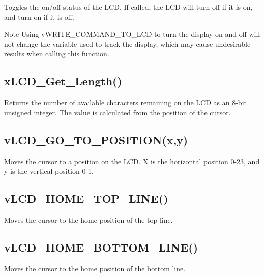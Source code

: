 Toggles the on/off status of the L\-C\-D. If called, the L\-C\-D will turn off if it is on, and turn on if it is off. \begin{DoxyNote}{Note}
Using v\-W\-R\-I\-T\-E\-\_\-\-C\-O\-M\-M\-A\-N\-D\-\_\-\-T\-O\-\_\-\-L\-C\-D to turn the display on and off will not change the variable used to track the display, which may cause undesirable results when calling this function.
\end{DoxyNote}
\hypertarget{_usage_length}{}\subsection{x\-L\-C\-D\-\_\-\-Get\-\_\-\-Length()}\label{_usage_length}
Returns the number of available characters remaining on the L\-C\-D as an 8-\/bit unsigned integer. The value is calculated from the position of the cursor.\hypertarget{_usage_goto}{}\subsection{v\-L\-C\-D\-\_\-\-G\-O\-\_\-\-T\-O\-\_\-\-P\-O\-S\-I\-T\-I\-O\-N(x,y)}\label{_usage_goto}
Moves the cursor to a position on the L\-C\-D. X is the horizontal position 0-\/23, and y is the vertical position 0-\/1.\hypertarget{_flowcharts_tophome}{}\subsection{v\-L\-C\-D\-\_\-\-H\-O\-M\-E\-\_\-\-T\-O\-P\-\_\-\-L\-I\-N\-E()}\label{_flowcharts_tophome}
Moves the cursor to the home position of the top line.\hypertarget{_flowcharts_bottomhome}{}\subsection{v\-L\-C\-D\-\_\-\-H\-O\-M\-E\-\_\-\-B\-O\-T\-T\-O\-M\-\_\-\-L\-I\-N\-E()}\label{_flowcharts_bottomhome}
Moves the cursor to the home position of the bottom line. 